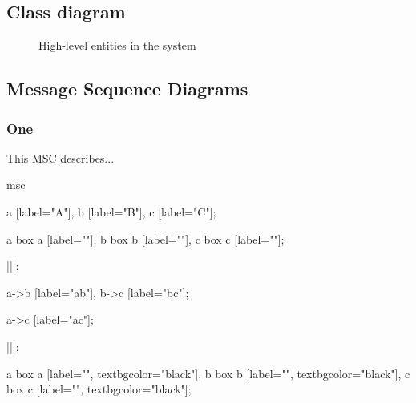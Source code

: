\subsection{Class diagram}
	\begin{figure}
		\centering
		\caption{High-level entities in the system}
		\label{fig:analysis-model}
	\end{figure}

\subsection{Message Sequence Diagrams}
	\subsubsection{One}
		This MSC describes...
		
		\begin{msc}
			msc
			{

				a [label="A"],
				b [label="B"],
				c [label="C"];

				a box a [label=""],
				b box b [label=""],
				c box c [label=""];

				|||;
				
				a->b [label="ab"],
				b->c [label="bc"];
				
				a->c [label="ac"];

				|||;

				a box a [label="", textbgcolor="black"],
				b box b [label="", textbgcolor="black"],
				c box c [label="", textbgcolor="black"];

			}
		\end{msc}